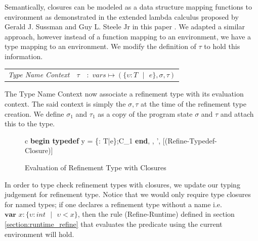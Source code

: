 \documentclass[a4paper,12pt]{report}
\begin{document}
\par
Semantically, closures can be modeled as a data structure mapping 
functions to environment as demonstrated in the extended lambda calculus proposed by 
Gerald J. Sussman and Guy L. Steele Jr in this paper \cite{closureLambdaOp}. We 
adapted a similar approach, however instead of a function mapping to an 
environment, we have a type mapping to an environment. We modify the 
definition of $\tau$ to hold this information.

\begin{center}
   \begin{tabular} {c c c}
     \textit{Type Name Context} & $\tau$& $:$ 
     $vars \mapsto (\{\upsilon : T\text{ }|\text{ }e\}, \sigma, \tau)$ \\
   \end{tabular}
\end{center}

The Type Name Context now associate a refinement type with its 
evaluation context. The said context is simply the $\sigma, \tau$ at the time of 
the refinement type creation. 
We define $\sigma_1$ and $\tau_1$ as a copy of the program state $\sigma$ and 
$\tau$ and attach this to the type. 

\begin{figure}[H]
  \begin{center}
    \begin{tabular} {c}
      {\langle\textbf{begin typedef } y = \{\upsilon : T\text{ }|\text{ }e\};C_1\textbf{ end}, 
      \sigma, \tau \rangle \longrightarrow \langle \sigma', \tau \rangle} [(Refine-Typedef-Closure)]
    \end{tabular}
  \end{center}
  \caption{Evaluation of Refinement Type with Closures}
\end{figure}

\par
In order to type check refinement types with closures, we update our typing 
judgement for refinement type. Notice that we would only require type 
closures for named types; if one declares a refinement type without a name i.e.  
$\textbf{var }x : \{\upsilon : int\text{ }|\text{ }\upsilon < x\}$, then the rule 
(Refine-Runtime) defined in section \ref{section:runtime_refine} that evaluates 
the predicate using the current environment will hold. 
\end{document}
